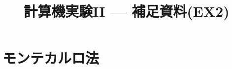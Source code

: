 \documentclass[dvipdfmx]{beamer}
\title{計算機実験II --- 補足資料(EX2)}
\begin{document}

\section{モンテカルロ法}



\end{document}

